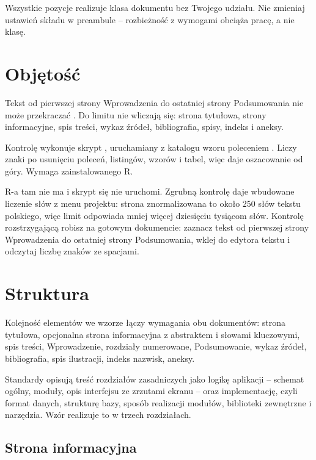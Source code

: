 Wszystkie pozycje realizuje klasa dokumentu bez Twojego udziału. Nie zmieniaj ustawień składu w preambule -- rozbieżność z wymogami obciąża pracę, a nie klasę.

\section{Objętość}

Tekst od pierwszej strony Wprowadzenia do ostatniej strony Podsumowania nie może przekraczać  \parencite{instrukcjaISI}. Do limitu nie wliczają się: strona tytułowa, strony informacyjne, spis treści, wykaz źródeł, bibliografia, spisy, indeks i aneksy.

 Kontrolę wykonuje skrypt , uruchamiany z katalogu wzoru poleceniem . Liczy znaki po usunięciu poleceń, listingów, wzorów i tabel, więc daje oszacowanie od góry. Wymaga zainstalowanego R.

 R-a tam nie ma i skrypt się nie uruchomi. Zgrubną kontrolę daje wbudowane liczenie słów z menu projektu: strona znormalizowana to około 250 słów tekstu polskiego, więc limit odpowiada mniej więcej dziesięciu tysiącom słów. Kontrolę rozstrzygającą robisz na gotowym dokumencie: zaznacz tekst od pierwszej strony Wprowadzenia do ostatniej strony Podsumowania, wklej do edytora tekstu i odczytaj liczbę znaków ze spacjami.

\section{Struktura}

Kolejność elementów we wzorze łączy wymagania obu dokumentów: strona tytułowa, opcjonalna strona informacyjna z abstraktem i słowami kluczowymi, spis treści, Wprowadzenie, rozdziały numerowane, Podsumowanie, wykaz źródeł, bibliografia, spis ilustracji, indeks nazwisk, aneksy.

Standardy opisują treść rozdziałów zasadniczych jako logikę aplikacji -- schemat ogólny, moduły, opis interfejsu ze zrzutami ekranu -- oraz implementację, czyli format danych, strukturę bazy, sposób realizacji modułów, biblioteki zewnętrzne i narzędzia. Wzór realizuje to w trzech rozdziałach.

\subsection{Strona informacyjna}

